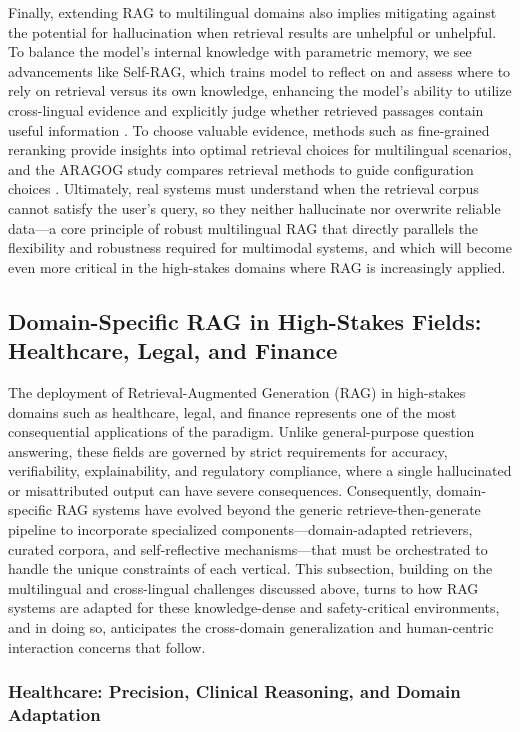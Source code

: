 \documentclass[11pt]{article}
\begin{document}
Finally, extending RAG to multilingual domains also implies mitigating against the potential for hallucination when retrieval results are unhelpful or unhelpful. To balance the model's internal knowledge with parametric memory, we see advancements like Self-RAG, which trains model to reflect on and assess where to rely on retrieval versus its own knowledge, enhancing the model's ability to utilize cross-lingual evidence and explicitly judge whether retrieved passages contain useful information \cite{ref41}. To choose valuable evidence, methods such as fine-grained reranking provide insights into optimal retrieval choices \cite{ref375} for multilingual scenarios, and the ARAGOG study compares retrieval methods to guide configuration choices \cite{ref381}. Ultimately, real systems must understand when the retrieval corpus cannot satisfy the user's query, so they neither hallucinate nor overwrite reliable data---a core principle of robust multilingual RAG that directly parallels the flexibility and robustness required for multimodal systems, and which will become even more critical in the high-stakes domains where RAG is increasingly applied.

\subsection{Domain-Specific RAG in High-Stakes Fields: Healthcare, Legal, and Finance}

The deployment of Retrieval-Augmented Generation (RAG) in high-stakes domains such as healthcare, legal, and finance represents one of the most consequential applications of the paradigm. Unlike general-purpose question answering, these fields are governed by strict requirements for accuracy, verifiability, explainability, and regulatory compliance, where a single hallucinated or misattributed output can have severe consequences. Consequently, domain-specific RAG systems have evolved beyond the generic retrieve-then-generate pipeline to incorporate specialized components---domain-adapted retrievers, curated corpora, and self-reflective mechanisms---that must be orchestrated to handle the unique constraints of each vertical. This subsection, building on the multilingual and cross-lingual challenges discussed above, turns to how RAG systems are adapted for these knowledge-dense and safety-critical environments, and in doing so, anticipates the cross-domain generalization and human-centric interaction concerns that follow.

\subsubsection{Healthcare: Precision, Clinical Reasoning, and Domain Adaptation}
\end{document}
